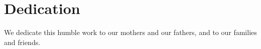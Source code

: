 \chapter*{Dedication}




We dedicate this humble work to our mothers and our fathers, and to our families and friends.